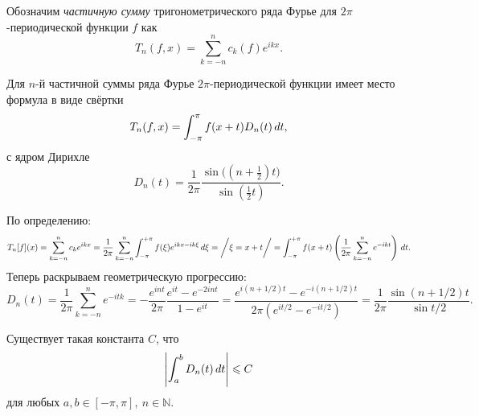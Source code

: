 
\begin{to_def}
    Обозначим \textit{частичную сумму} тригонометрического ряда Фурье для $2\pi$-периодической функции $f$ как
    \begin{equation*}
        T_n (f, x) = \sum_{k=-n}^n c_k (f) e^{ikx}.
    \end{equation*}
\end{to_def}

\begin{to_lem}
    Для $n$-й частичной суммы ряда Фурье $2\pi$-периодической функции имеет место формула в виде свёртки
    \begin{equation*}
        T_n (f, x) = \int_{-\pi}^{\pi} f(x+t) D_n (t) \, d t,
    \end{equation*}
    с ядром Дирихле
    \begin{equation*}
        D_n (t) = \frac{1}{2\pi} \frac{\sin \big(\left(n+\frac{1}{2}\right) t\big)}{\sin\left(\frac{1}{2} t\right)}.
    \end{equation*}
\end{to_lem}

\begin{uproof}
    По определению:
    \begin{equation*}
        T_n[f](x) = \sum_{k=-n}^{n} c_k e^{ikx}
        =
        \frac{1}{2\pi} \sum_{k=-n}^{n} \int_{-\pi}^{+\pi}
        f(\xi) e^{ikx-ik\xi} \, d \xi
        = \bigg/
            \xi = x + t
        \bigg/ = \int_{-\pi}^{+\pi} f(x+t) \left(
            \frac{1}{2\pi} \sum_{k=-n}^{n} e^{-ikt}
        \right) \, d t.
    \end{equation*}
    Теперь раскрываем геометрическую прогрессию:
    \begin{equation*}
        D_n (t) = \frac{1}{2\pi} \sum_{k=-n}^{n} e^{-itk} = 
        - \frac{e^{int}}{2\pi} \frac{e^{it}-e^{-2int}}{1 - e^{it}} = 
        \frac{e^{i(n+1/2)t}-e^{-i(n+1/2)t}}{2\pi \left(e^{it/2}-e^{-it/2}\right)} = 
        \frac{1}{2\pi} \frac{\sin(n+1/2)t}{\sin t/2}.
    \end{equation*}
\end{uproof}


\begin{to_lem}
    Существует такая константа $C$, что 
    \begin{equation*}
        \left|
        \int_a^b D_n (t) \, d t
        \right| \leqslant C
    \end{equation*}
    для любых $a, b \in [-\pi, \pi], \ n \in \mathbb{N}$.
\end{to_lem}


